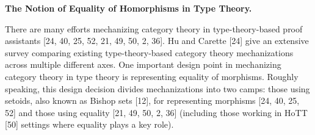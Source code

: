 \documentclass[10pt,a4paper]{article}
\begin{document}
\par\medskip\noindent\textbf{The Notion of Equality of Homorphisms in Type Theory.}\par
 
 
There are many efforts mechanizing category theory in type-theory-based proof assistants [24, 40, 25, 52, 21, 49, 50, 2, 36]. Hu and Carette [24] give an extensive survey comparing existing type-theory-based category theory mechanizations across multiple different axes. One important design point in mechanizing category theory in type theory is representing equality of morphisms. Roughly speaking, this design decision divides mechanizations into two camps: those using setoids, also known as Bishop sets [12], for representing morphisms [24, 40, 25, 52] and those using equality [21, 49, 50, 2, 36] (including those working in HoTT [50] settings where equality plays a key role).\par
 
 
 
\end{document}
